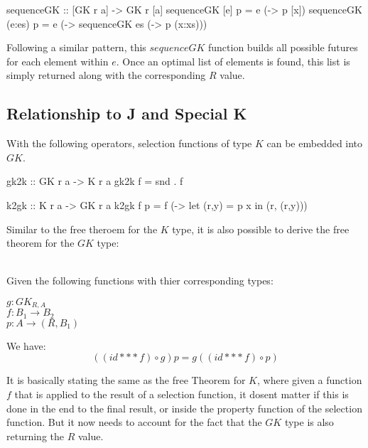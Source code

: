 \documentclass[runningheads]{llncs}
\newenvironment{reasoning}{\begin{adjustwidth}{0.2in}{}}{\end{adjustwidth}}
\newcommand{\ignore}[1]{}
\begin{document}
\begin{code}
sequenceGK :: [GK r a] -> GK r [a]
sequenceGK [e] p    = e (\x -> p [x])
sequenceGK (e:es) p = e (\x -> sequenceGK es (\xs -> p (x:xs)))
\end{code}

Following a similar pattern, this \(sequenceGK\) function builds all
possible futures for each element within \(e\). Once an optimal list of
elements is found, this list is simply returned along with the
corresponding \(R\) value.

\subsection{Relationship to J and Special
K}\label{relationship-to-j-and-special-k}

With the following operators, selection functions of type \(K\) can be
embedded into \(GK\).

\ignore{

> gk2k :: forall r a b. ((a -> (r,b)) -> (r,b)) -> ((a -> (r,b)) -> b)
> gk2k f = snd . f

}

\begin{haskell}
gk2k :: GK r a -> K r a 
gk2k f = snd . f
\end{haskell}

\begin{code}
k2gk :: K r a -> GK r a
k2gk f p = f (\x -> let (r,y) = p x in (r, (r,y)))
\end{code}

Similar to the free theroem for the \(K\) type, it is also possible to
derive the free theorem for the \(GK\) type:

\begin{theorem}\\
Given the following functions with thier corresponding types:
\begin{reasoning}
  $g : GK_{R,A}$\\
  $f : B_1 \rightarrow B_2$\\
  $p : A \rightarrow (R, B_1)$\\
\end{reasoning}
We have:
\[((id *** f) \circ g) p = g ((id *** f) \circ p)\]
\end{theorem}

It is basically stating the same as the free Theorem for \(K\), where
given a function \(f\) that is applied to the result of a selection
function, it dosent matter if this is done in the end to the final
result, or inside the property function of the selection function. But
it now needs to account for the fact that the \(GK\) type is also
returning the \(R\) value.
\end{document}
